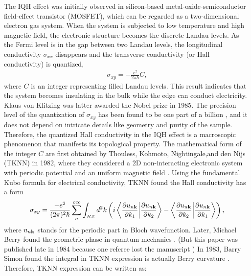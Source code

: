 The IQH effect was initially observed in silicon-based metal-oxide-semiconductor field-effect transistor (MOSFET), which can be regarded as a two-dimensional electron gas system. When the system is subjected to low temperature and high magnetic field, the electronic structure becomes the discrete Landau levels. As the Fermi level is in the gap between two Landau levels, the longitudinal conductivity $\sigma_{xx}$ disappears and the transverse conductivity (or Hall conductivity) is quantized,
	\begin{equation}
		\label{eq:2}
		\begin{aligned}
			\sigma_{xy} = - \frac{e^2}{2\pi\hbar} C,
		\end{aligned}
	\end{equation}
where $C$ is an integer representing filled Landau levels. This result indicates that the system becomes insulating in the bulk while the edge can conduct electricity. Klaus von Klitzing was latter awarded the Nobel prize in 1985. The precision level of the quantization of $\sigma_{xy}$ has been found to be one part of a billion \cite{von2005developments}, and it does not depend on intricate details like geometry and purity of the sample. Therefore, the quantized Hall conductivity in the IQH effect is a macroscopic phenomenon that manifests its topological property. The mathematical form of the integer $C$ are first obtained by Thouless, Kohmoto, Nightingale,and den Nijs (TKNN) in 1982, where they considered a 2D non-interacting electronic system with periodic potential and an uniform magnetic field \cite{TKNN}. Using the fundamental Kubo formula for electrical conductivity, TKNN found the Hall conductivity has a form
	\begin{equation}
		\label{sigma_xy}
		\begin{aligned}
			\sigma_{xy} = \frac{-e^2}{(2\pi)^2\hbar} \sum_n^{occ} \int_{BZ}  d^2k \left( i \left\langle \frac{\partial u_{n\bf k}}{\partial k_1} \middle| \frac{\partial u_{n\bf k} }{\partial k_2} \right\rangle - \left\langle \frac{\partial u_{n\bf k}}{\partial k_2} \middle| \frac{\partial u_{n\bf k} }{\partial k_1} \right\rangle \right),
		\end{aligned}
	\end{equation}
where $u_{n\bf k}$ stands for the periodic part in Bloch wavefunction. Later, Michael Berry found the geometric phase in quantum mechanics \cite{berry1984quantal}. (But this paper was published late in 1984 because one referee lost the manuscript \cite{berry2010geometric}) In 1983, Barry Simon found the integral in TKNN expression is actually Berry curvature \cite{simon1983holonomy}. Therefore, TKNN expression can be written as:
